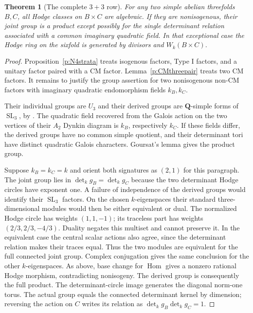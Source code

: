 \documentclass[10pt,reqno]{article}
\theoremstyle{emphasizedplain}
\newtheorem{theorem}{Theorem}[section]
\theoremstyle{emphasizeddefinition}
\theoremstyle{emphasizeddefinition}
\DeclareMathOperator{\Hom}{Hom}
\DeclareMathOperator{\SL}{SL}
\newcommand{\Q}{\mathbf Q}
\begin{document}
\begin{theorem}[The complete $3+3$ row]\label{p:N4complete}
For any two simple abelian threefolds $B,C$, all Hodge classes on
$B\times C$ are algebraic. If they are nonisogenous, their joint group
is a product except possibly for the single determinant relation
associated with a common imaginary quadratic field. In that exceptional
case the Hodge ring on the sixfold is generated by divisors and
$W_k(B\times C)$.
\end{theorem}
\begin{proof}
Proposition~\ref{p:N4strata} treats isogenous factors, Type I factors,
and a unitary factor paired with a CM factor. Lemma~\ref{p:CMthreepair}
treats two CM factors. It remains to justify the group assertion for
two nonisogenous non-CM factors with imaginary quadratic endomorphism
fields $k_B,k_C$.

Their individual groups are $U_3$ and their derived groups are
$\Q$-simple forms of $\SL_3$, by \cite[\S2.3]{MZ}.
The quadratic field recovered from the Galois action on the two
vertices of their $A_2$ Dynkin diagram is $k_B$, respectively $k_C$.
If these fields differ, the derived groups have no common simple
quotient, and their determinant tori have distinct quadratic Galois
characters. Goursat's lemma gives the product group.

Suppose $k_B=k_C=k$ and orient both signatures as $(2,1)$ for this
paragraph. The joint group lies in $\det_k g_B=\det_k g_C$ because
the two determinant Hodge circles have exponent one. A failure of
independence of the derived groups would identify their $\SL_3$
factors. On the chosen $k$-eigenspaces their standard three-dimensional
modules would then be either equivalent or dual. The normalized Hodge
circle has weights $(1,1,-1)$; its traceless part has weights
$(2/3,2/3,-4/3)$. Duality negates this multiset and cannot preserve it.
In the equivalent case the central scalar actions also agree, since
the determinant relation makes their traces equal. Thus the two
modules are equivalent for the full connected joint group. Complex
conjugation gives the same conclusion for the other $k$-eigenspaces.
As above, base change for $\Hom$ gives a nonzero rational Hodge
morphism, contradicting nonisogeny. The derived group is consequently
the full product. The determinant-circle image generates the diagonal
norm-one torus. The actual group equals the connected determinant
kernel by dimension; reversing the action on $C$ writes its relation
as $\det_k g_B\det_k g_C=1$.


\end{proof}
\end{document}

